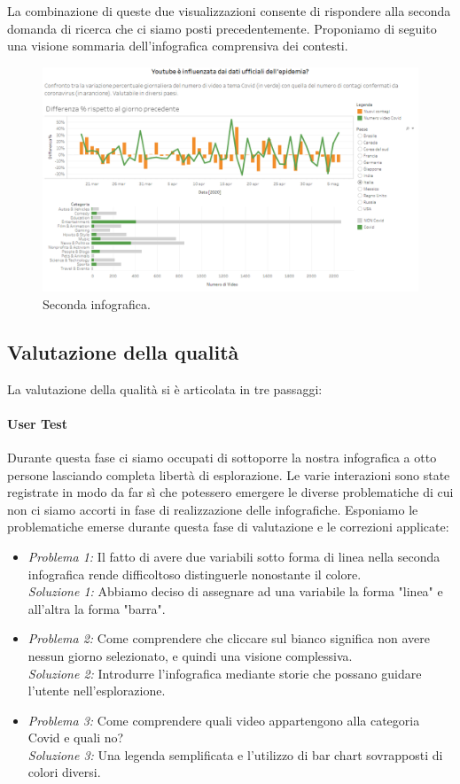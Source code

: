 \documentclass[10pt, a4paper,openany]{article}
\begin{document}
La combinazione di queste due visualizzazioni consente di rispondere alla seconda domanda di ricerca che ci siamo posti precedentemente. Proponiamo di seguito una visione sommaria dell'infografica comprensiva dei contesti.

\begin{figure}[H]
	\centering
	\includegraphics[height=0.5 \linewidth]{pics/seconda_infografica.png}
	\caption{Seconda infografica.}
\end{figure}
\subsection*{Valutazione della qualità}
La valutazione della qualità si è articolata in tre passaggi:

\paragraph{User Test} Durante questa fase ci siamo occupati di sottoporre la nostra infografica a otto persone lasciando completa libertà di esplorazione. Le varie interazioni sono state registrate in modo da far sì che potessero emergere le diverse problematiche di cui non ci siamo accorti in fase di realizzazione delle infografiche. Esponiamo le problematiche emerse durante questa fase di valutazione e le correzioni applicate:

\begin{itemize}
	\item \textit{Problema 1:} Il fatto di avere due variabili sotto forma di linea nella seconda infografica rende difficoltoso distinguerle nonostante il colore.\\\textit{Soluzione 1:} Abbiamo deciso di assegnare ad una variabile la forma "linea" e all'altra la forma "barra".
	\item  \textit{Problema 2:} Come comprendere che cliccare sul bianco significa non avere nessun giorno selezionato, e quindi una visione complessiva.\\\textit{Soluzione 2:} Introdurre l'infografica mediante storie che possano guidare l'utente nell'esplorazione.
	\item  \textit{Problema 3:} Come comprendere quali video appartengono alla categoria Covid e quali no? \\\textit{Soluzione 3:} Una legenda semplificata e l'utilizzo di bar chart sovrapposti di colori diversi.
\end{itemize}
\end{document}
